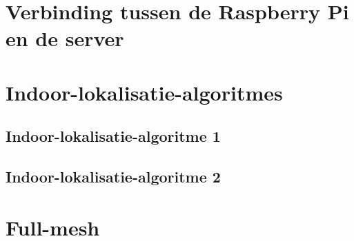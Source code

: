 \section{Verbinding tussen de Raspberry Pi en de server} \label{sec:raspberry_server}


\section{Indoor-lokalisatie-algoritmes} \label{sec:algoritmes}
\subsection{Indoor-lokalisatie-algoritme 1} \label{sec:algoritme_1}


\subsection{Indoor-lokalisatie-algoritme 2} \label{sec:algoritme_2}


\section{Full-mesh} \label{sec:full_mesh}
